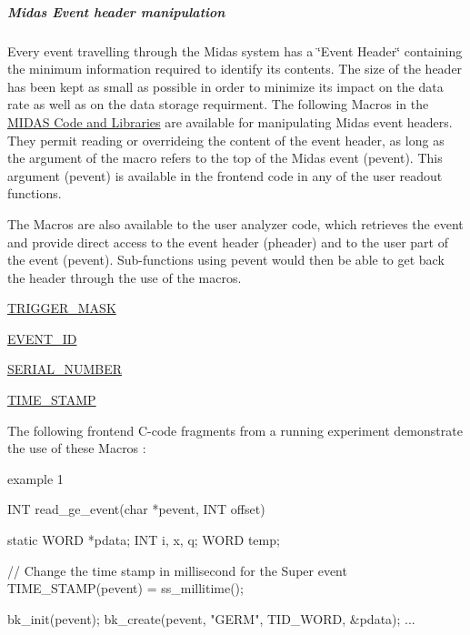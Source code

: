 \par
 

 \par
\hypertarget{FE_bank_construction_FE_Midas_Event_Header_Manipulation}{}\subparagraph{Midas Event header manipulation}\label{FE_bank_construction_FE_Midas_Event_Header_Manipulation}
\label{FE_bank_construction_FE_Midas_Event_Header_Macros}
\hypertarget{FE_bank_construction_FE_Midas_Event_Header_Macros}{}
 Every event travelling through the Midas system has a \char`\"{}Event Header\char`\"{} containing the minimum information required to identify its contents. The size of the header has been kept as small as possible in order to minimize its impact on the data rate as well as on the data storage requirment. The following Macros in the \hyperlink{F_Midas_Code_and_Libraries_F_Midas_Library}{MIDAS Code and Libraries} are available for manipulating Midas event headers. They permit reading or overrideing the content of the event header, as long as the argument of the macro refers to the top of the Midas event (pevent). This argument (pevent) is available in the frontend code in any of the user readout functions.

The Macros are also available to the user analyzer code, which retrieves the event and provide direct access to the event header (pheader) and to the user part of the event (pevent). Sub-\/functions using pevent would then be able to get back the header through the use of the macros.


\begin{DoxyItemize}
\item \hyperlink{group__mbufferh_ga6a0d6be5b8aad5a907d5b880bae93eb9}{TRIGGER\_\-MASK}
\item \hyperlink{group__mbufferh_gaf42c9a1ac33cf459bfd366673f6a4d70}{EVENT\_\-ID}
\item \hyperlink{group__mbufferh_gadbb75a9d81e264e357bc5fc73dd4ebb8}{SERIAL\_\-NUMBER}
\item \hyperlink{group__mbufferh_gae8d2f03c283637c81cdcfd3fda065d53}{TIME\_\-STAMP}
\end{DoxyItemize}

\label{FE_bank_construction_timestamp}
\hypertarget{FE_bank_construction_timestamp}{}
 The following frontend C-\/code fragments from a running experiment demonstrate the use of these Macros :
\begin{DoxyItemize}
\item example 1 
\begin{DoxyCode}
INT read_ge_event(char *pevent, INT offset)
{
  static WORD *pdata;
  INT i, x, q;
  WORD temp;
 
  // Change the time stamp in millisecond for the Super event
  TIME_STAMP(pevent) = ss_millitime();
  
  bk_init(pevent);
  bk_create(pevent, "GERM", TID_WORD, &pdata);
  ...
}
\end{DoxyCode}

\end{DoxyItemize}


